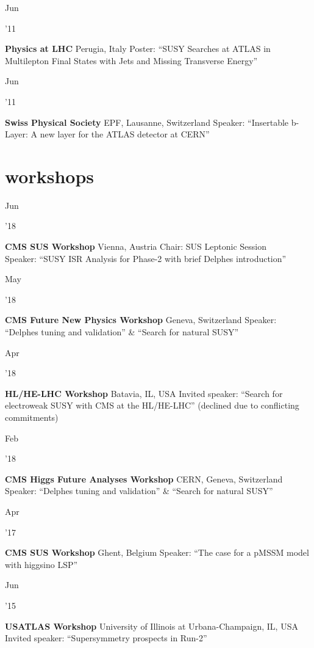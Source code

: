 \documentclass[]{cv} %
\begin{document}
\begin{entrylist}
  \entry
  {\parbox[t]{\parboxWidthOne}{Jun}\parbox[t]{\parboxWidthTwo}{\hfill '11}}
  {\textbf{Physics at LHC}}
  {Perugia, Italy}
  {Poster: ``SUSY Searches at ATLAS in Multilepton Final States with Jets and Missing Transverse Energy''}

  \entry
  {\parbox[t]{\parboxWidthOne}{Jun}\parbox[t]{\parboxWidthTwo}{\hfill '11}}
  {\textbf{Swiss Physical Society}}
  {EPF, Lausanne, Switzerland}
  {Speaker: ``Insertable b-Layer: A new layer for the ATLAS detector at CERN''}

\end{entrylist}

\section{workshops}

\begin{entrylist}

  \entry
  {\parbox[t]{\parboxWidthOne}{Jun}\parbox[t]{\parboxWidthTwo}{\hfill '18}}
  {\textbf{CMS SUS Workshop}}
  {Vienna, Austria}
  {Chair: SUS Leptonic Session\\
  Speaker: ``SUSY ISR Analysis for Phase-2 with brief Delphes introduction''}

  \entry
  {\parbox[t]{\parboxWidthOne}{May}\parbox[t]{\parboxWidthTwo}{\hfill '18}}
  {\textbf{CMS Future New Physics Workshop}}
  {Geneva, Switzerland}
  {Speaker: ``Delphes tuning and validation'' \& ``Search for natural SUSY''}

  \entry
  {\parbox[t]{\parboxWidthOne}{Apr}\parbox[t]{\parboxWidthTwo}{\hfill '18}}
  {\textbf{HL/HE-LHC Workshop}}
  {Batavia, IL, USA}
  {Invited speaker: ``Search for electroweak SUSY with CMS at the HL/HE-LHC'' (declined
  due to conflicting commitments)}

  \entry
  {\parbox[t]{\parboxWidthOne}{Feb}\parbox[t]{\parboxWidthTwo}{\hfill '18}}
  {\textbf{CMS Higgs Future Analyses Workshop}}
  {CERN, Geneva, Switzerland}
  {Speaker: ``Delphes tuning and validation'' \& ``Search for natural SUSY''}

  \entry
  {\parbox[t]{\parboxWidthOne}{Apr}\parbox[t]{\parboxWidthTwo}{\hfill '17}}
  {\textbf{CMS SUS Workshop}}
  {Ghent, Belgium}
  {Speaker: ``The case for a pMSSM model with higgsino LSP''}

  \entry
  {\parbox[t]{\parboxWidthOne}{Jun}\parbox[t]{\parboxWidthTwo}{\hfill '15}}
  {\textbf{USATLAS Workshop}}
  {University of Illinois at Urbana-Champaign, IL, USA}
  {Invited speaker: ``Supersymmetry prospects in Run-2''}

\end{entrylist}
\end{document}
